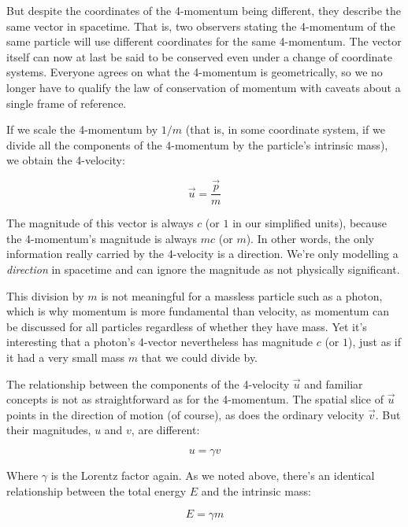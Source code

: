 But despite the coordinates of the 4-momentum being different, they describe the same vector in spacetime. That is, two observers stating the 4-momentum of the same particle will use different coordinates for the same 4-momentum. The vector itself can now at last be said to be conserved even under a change of coordinate systems. Everyone agrees on what the 4-momentum is geometrically, so we no longer have to qualify the law of conservation of momentum with caveats about a single frame of reference.

If we scale the 4-momentum by $1/m$ (that is, in some coordinate system, if we divide all the components of the 4-momentum by the particle's intrinsic mass), we obtain the 4-velocity:

$$\vec{u} = \frac{\vec{p}}{m}$$

The magnitude of this vector is always $c$ (or $1$ in our simplified units), because the 4-momentum's magnitude is always $mc$ (or $m$). In other words, the only information really carried by the 4-velocity is a direction. We're only modelling a \textit{direction} in spacetime and can ignore the magnitude as not physically significant.

This division by $m$ is not meaningful for a massless particle such as a photon, which is why momentum is more fundamental than velocity, as momentum can be discussed for all particles regardless of whether they have mass. Yet it's interesting that a photon's 4-vector nevertheless has magnitude $c$ (or $1$), just as if it had a very small mass $m$ that we could divide by.

The relationship between the components of the 4-velocity $\vec{u}$ and familiar concepts is not as straightforward as for the 4-momentum. The spatial slice of $\vec{u}$ points in the direction of motion (of course), as does the ordinary velocity $\vec{v}$. But their magnitudes, $u$ and $v$, are different:

$$u = \gamma v$$

Where $\gamma$ is the Lorentz factor again. As we noted above, there's an identical relationship between the total energy $E$ and the intrinsic mass:

$$E = \gamma m$$


